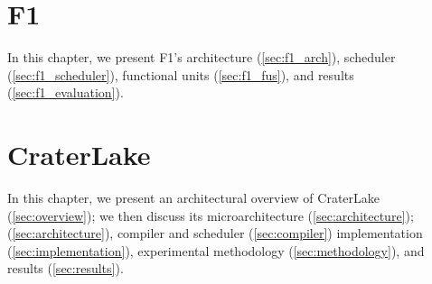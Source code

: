 \documentclass[12pt,twoside]{mitthesis}
\begin{document}


\pagestyle{plain}





\chapter{F1}

In this chapter, we present F1's architecture (\autoref{sec:f1_arch}),
scheduler (\autoref{sec:f1_scheduler}), functional units
(\autoref{sec:f1_fus}), and results (\autoref{sec:f1_evaluation}).





\let\cleardoublepage\clearpage %
\chapter{CraterLake}\label{ch:craterlake}

In this chapter, we present an architectural overview of CraterLake
(\autoref{sec:overview}); we then discuss its microarchitecture
(\autoref{sec:architecture}); (\autoref{sec:architecture}), compiler and
scheduler (\autoref{sec:compiler}) implementation
(\autoref{sec:implementation}), experimental methodology
(\autoref{sec:methodology}), and results (\autoref{sec:results}).










\begin{singlespacing}

\end{singlespacing}
\end{document}
